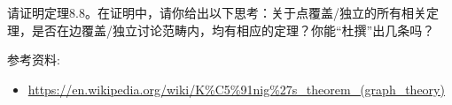 \documentclass[a4paper, justified]{tufte-handout}
\begin{document}
\beginot
\begin{ot}[点独立与点覆盖]
  请证明定理8.8。在证明中，请你给出以下思考：关于点覆盖/独立的所有相关定理，是否在边覆盖/独立讨论范畴内，均有相应的定理？你能“杜撰”出几条吗？

\end{ot}


\begin{ot}
  \noindent 参考资料:
  \begin{itemize}
    \item \href{https://en.wikipedia.org/wiki/K\%C5\%91nig\%27s_theorem_(graph_theory)}{https://en.wikipedia.org/wiki/K\%C5\%91nig\%27s\_theorem\_(graph\_theory)}
  \end{itemize}

\end{ot}





% 




\beginfb

% 
% 
\end{document}

